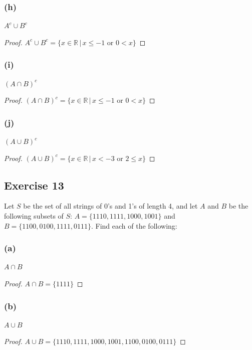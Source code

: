 \documentclass[14pt]{extarticle}
\newcommand{\R}{\mathbb{R}}
\begin{document}
\subsubsection{(h)}
$A^c \cup B^c$

\begin{proof}
\(A^c \cup B^c = \{x \in \R \, | \, x \leq -1 \text{ or } 0 < x\}\)
\end{proof}

\subsubsection{(i)}
$(A \cap B)^c$

\begin{proof}
\((A \cap B)^c = \{x \in \R \, | \, x \leq -1 \text{ or } 0 < x\}\)
\end{proof}

\subsubsection{(j)}
$(A \cup B)^c$

\begin{proof}
\((A \cup B)^c = \{x \in \R \, | \, x < -3 \text{ or } 2 \leq x\}\)
\end{proof}

\subsection{Exercise 13}
Let $S$ be the set of all strings of 0’s and 1’s of length 4, and let $A$ and $B$ be the following subsets of $S$: 
\(A = \{1110, 1111, 1000, 1001\}\) and \(B = \{1100, 0100, 1111, 0111\}\). Find each of the following:

\subsubsection{(a)}
$A \cap B$

\begin{proof}
\(A \cap B = \{1111\}\)
\end{proof}

\subsubsection{(b)}
$A \cup B$

\begin{proof}
\(A \cup B = \{1110, 1111, 1000, 1001, 1100, 0100, 0111\}\)
\end{proof}
\end{document}
